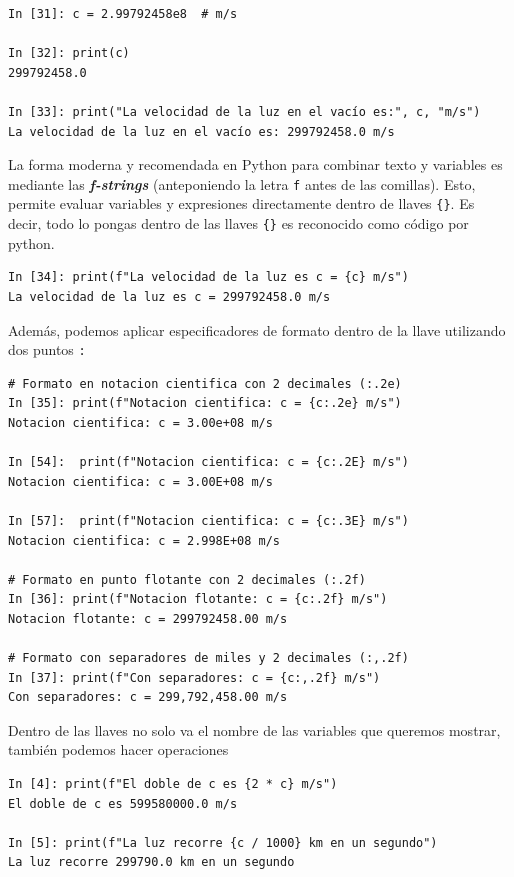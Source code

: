 \documentclass[12pt]{article}
\begin{document}
\begin{lstlisting}
In [31]: c = 2.99792458e8  # m/s

In [32]: print(c)
299792458.0

In [33]: print("La velocidad de la luz en el vacío es:", c, "m/s")
La velocidad de la luz en el vacío es: 299792458.0 m/s
\end{lstlisting}

La forma moderna y recomendada en Python para combinar texto y variables es 
mediante las \textbf{\textit{f-strings}} (anteponiendo la letra \texttt{f} antes de las comillas).
Esto, permite evaluar variables y expresiones directamente dentro de llaves \texttt{\{\}}. Es decir,
todo lo pongas dentro de las llaves \texttt{\{\}} es reconocido como código por python.

\begin{lstlisting}
In [34]: print(f"La velocidad de la luz es c = {c} m/s")
La velocidad de la luz es c = 299792458.0 m/s
\end{lstlisting}

Además, podemos aplicar especificadores de formato dentro de la llave utilizando dos puntos \texttt{:}

\begin{lstlisting}
# Formato en notacion cientifica con 2 decimales (:.2e)
In [35]: print(f"Notacion cientifica: c = {c:.2e} m/s")
Notacion cientifica: c = 3.00e+08 m/s

In [54]:  print(f"Notacion cientifica: c = {c:.2E} m/s")
Notacion cientifica: c = 3.00E+08 m/s

In [57]:  print(f"Notacion cientifica: c = {c:.3E} m/s")
Notacion cientifica: c = 2.998E+08 m/s

# Formato en punto flotante con 2 decimales (:.2f)
In [36]: print(f"Notacion flotante: c = {c:.2f} m/s")
Notacion flotante: c = 299792458.00 m/s

# Formato con separadores de miles y 2 decimales (:,.2f)
In [37]: print(f"Con separadores: c = {c:,.2f} m/s")
Con separadores: c = 299,792,458.00 m/s
\end{lstlisting}

Dentro de las llaves no solo va el nombre de las variables que queremos mostrar, 
también podemos hacer operaciones 

\begin{lstlisting}
In [4]: print(f"El doble de c es {2 * c} m/s")
El doble de c es 599580000.0 m/s

In [5]: print(f"La luz recorre {c / 1000} km en un segundo")
La luz recorre 299790.0 km en un segundo
\end{lstlisting}
\end{document}
